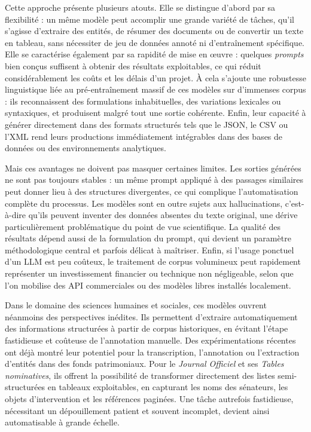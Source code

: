 Cette approche présente plusieurs atouts. Elle se distingue d’abord par sa flexibilité : un même modèle peut accomplir une grande variété de tâches, qu’il s’agisse d’extraire des entités, de résumer des documents ou de convertir un texte en tableau, sans nécessiter de jeu de données annoté ni d’entraînement spécifique. Elle se caractérise également par sa rapidité de mise en œuvre : quelques \emph{prompts} bien conçus suffisent à obtenir des résultats exploitables, ce qui réduit considérablement les coûts et les délais d’un projet. À cela s’ajoute une robustesse linguistique liée au pré-entraînement massif de ces modèles sur d’immenses corpus : ils reconnaissent des formulations inhabituelles, des variations lexicales ou syntaxiques, et produisent malgré tout une sortie cohérente. Enfin, leur capacité à générer directement dans des formats structurés tels que le JSON, le CSV ou l’XML rend leurs productions immédiatement intégrables dans des bases de données ou des environnements analytiques.

Mais ces avantages ne doivent pas masquer certaines limites. Les sorties générées ne sont pas toujours stables : un même prompt appliqué à des passages similaires peut donner lieu à des structures divergentes, ce qui complique l’automatisation complète du processus. Les modèles sont en outre sujets aux hallucinations, c’est-à-dire qu’ils peuvent inventer des données absentes du texte original, une dérive particulièrement problématique du point de vue scientifique. La qualité des résultats dépend aussi de la formulation du prompt, qui devient un paramètre méthodologique central et parfois délicat à maîtriser. Enfin, si l’usage ponctuel d’un LLM est peu coûteux, le traitement de corpus volumineux peut rapidement représenter un investissement financier ou technique non négligeable, selon que l’on mobilise des API commerciales ou des modèles libres installés localement.

Dans le domaine des sciences humaines et sociales, ces modèles ouvrent néanmoins des perspectives inédites. Ils permettent d’extraire automatiquement des informations structurées à partir de corpus historiques, en évitant l’étape fastidieuse et coûteuse de l’annotation manuelle. Des expérimentations récentes ont déjà montré leur potentiel pour la transcription, l’annotation ou l’extraction d’entités dans des fonds patrimoniaux. Pour le \emph{Journal Officiel} et ses \emph{Tables nominatives}, ils offrent la possibilité de transformer directement des listes semi-structurées en tableaux exploitables, en capturant les noms des sénateurs, les objets d’intervention et les références paginées. Une tâche autrefois fastidieuse, nécessitant un dépouillement patient et souvent incomplet, devient ainsi automatisable à grande échelle.

